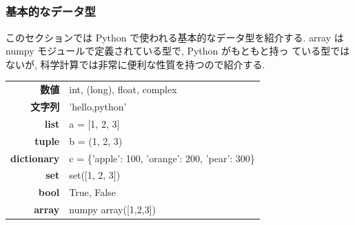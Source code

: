 \subsection*{\redm\whiteb\greenb}
\begin{frame}[t, fragile]
\frametitle{基本的なデータ型}
\alert{このセクションでは Python で使われる基本的なデータ型を紹介する. } array は numpy モジュールで定義されている型で, Python がもともと持っ
ている型ではないが, 科学計算では非常に便利な性質を持つので紹介する. 

\begin{table}[hb]
 \begin{tabular}{r|l} 
  \textbf{数値}       & int, (long), float, complex \\
  \textbf{文字列}     & 'hello,python' \\
  \textbf{list}       & a = [1, 2, 3] \\
  \textbf{tuple}      & b = (1, 2, 3) \\
  \textbf{dictionary} & c = \{'apple': 100, 'orange': 200, 'pear': 300\} \\
  \textbf{set}        & set([1, 2, 3]) \\
  \textbf{bool}       & True, False \\
  \textbf{array}      & numpy array([1,2,3]) \\
 \end{tabular}
\end{table}
\end{frame}

